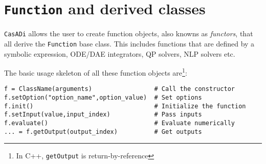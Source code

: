 \documentclass[a4paper,12pt]{book}
\newcommand{\CasADi}{\texttt{CasADi}\xspace}
\newcounter{pytexcount}
\newcounter{pytexsubcount}
\newenvironment{pytexTemplate}[1]{
\begin{rawhtml}
<div style="display:none">
\end{rawhtml}
}{
\begin{rawhtml}
</div>
\end{rawhtml}
}
\newcommand{\pytexStart}[1]{
  \addtocounter{pytexcount}{1}%
  \setcounter{pytexsubcount}{0}%
}
\renewenvironment{pytex}
{\addtocounter{pytexsubcount}{1}%
\begin{rawhtml}
<div style="color: black; background-color: \#b9c8db;  border-style: dotted; border-width: 1px; padding:2px;padding-left:1em" >
<pre>
\end{rawhtml}
}%
{\begin{rawhtml}
</pre>
</div>
<div style="color: black; background-color: \#fffff;  border-style: solid; border-width: 1px; padding:2px;padding-left:1em;margin-left:1em;" >\end{rawhtml}%
\verbatiminputeval{pytex_\alph{pytexcount}_\arabic{pytexsubcount}.log}%
\begin{rawhtml}
</div>
\end{rawhtml}
}
\begin{document}






\section{\texttt{Function} and derived classes} \label{sec:function}
\CasADi allows the user to create function objects, also knowns as \emph{functors}, that all derive the \texttt{Function} base class. This includes functions that are defined by a symbolic expression, ODE/DAE integrators, QP solvers, NLP solvers etc.

The basic usage skeleton of all these function objects are\footnote{In C++, \texttt{getOutput} is return-by-reference}:
\begin{verbatim}
f = ClassName(arguments)                 # Call the constructor
f.setOption("option_name",option_value)  # Set options
f.init()                                 # Initialize the function
f.setInput(value,input_index)            # Pass inputs
f.evaluate()                             # Evaluate numerically
... = f.getOutput(output_index)          # Get outputs
\end{verbatim}
\end{document}

